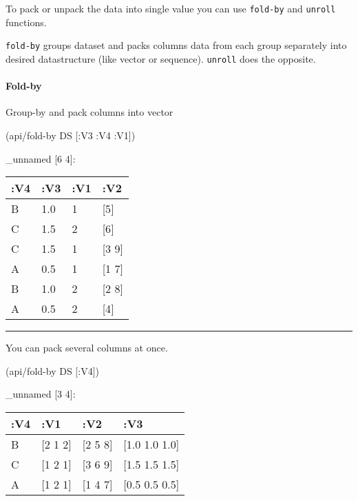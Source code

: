 \documentclass[]{article}
\newenvironment{Shaded}{\begin{snugshade}}{\end{snugshade}}
\newcommand{\AttributeTok}[1]{\textcolor[rgb]{0.77,0.63,0.00}{#1}}
\newcommand{\NormalTok}[1]{#1}
\let\oldparagraph\paragraph
\renewcommand{\paragraph}[1]{\oldparagraph{#1}\mbox{}}
\begin{document}
To pack or unpack the data into single value you can use
\texttt{fold-by} and \texttt{unroll} functions.

\texttt{fold-by} groups dataset and packs columns data from each group
separately into desired datastructure (like vector or sequence).
\texttt{unroll} does the opposite.

\hypertarget{fold-by}{%
\paragraph{Fold-by}\label{fold-by}}

Group-by and pack columns into vector

\begin{Shaded}
\begin{Highlighting}[]
\NormalTok{(api/fold-by DS [}\AttributeTok{:V3} \AttributeTok{:V4} \AttributeTok{:V1}\NormalTok{])}
\end{Highlighting}
\end{Shaded}

\_unnamed {[}6 4{]}:

\begin{longtable}[]{@{}llll@{}}
\toprule
:V4 & :V3 & :V1 & :V2\tabularnewline
\midrule
\endhead
B & 1.0 & 1 & {[}5{]}\tabularnewline
C & 1.5 & 2 & {[}6{]}\tabularnewline
C & 1.5 & 1 & {[}3 9{]}\tabularnewline
A & 0.5 & 1 & {[}1 7{]}\tabularnewline
B & 1.0 & 2 & {[}2 8{]}\tabularnewline
A & 0.5 & 2 & {[}4{]}\tabularnewline
\bottomrule
\end{longtable}

\begin{center}\rule{0.5\linewidth}{0.5pt}\end{center}

You can pack several columns at once.

\begin{Shaded}
\begin{Highlighting}[]
\NormalTok{(api/fold-by DS [}\AttributeTok{:V4}\NormalTok{])}
\end{Highlighting}
\end{Shaded}

\_unnamed {[}3 4{]}:

\begin{longtable}[]{@{}llll@{}}
\toprule
:V4 & :V1 & :V2 & :V3\tabularnewline
\midrule
\endhead
B & {[}2 1 2{]} & {[}2 5 8{]} & {[}1.0 1.0 1.0{]}\tabularnewline
C & {[}1 2 1{]} & {[}3 6 9{]} & {[}1.5 1.5 1.5{]}\tabularnewline
A & {[}1 2 1{]} & {[}1 4 7{]} & {[}0.5 0.5 0.5{]}\tabularnewline
\bottomrule
\end{longtable}
\end{document}
